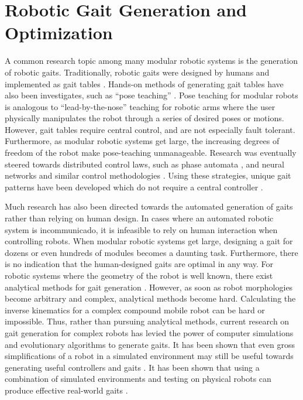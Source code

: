   \section{Robotic Gait Generation and Optimization}
    A common research topic among many modular robotic systems is the
      generation of robotic gaits. 
    Traditionally, robotic gaits were designed by humans and implemented as
      gait tables \cite{Yim2000, Kamimura2001}. 
    Hands-on methods of generating gait tables have also been investigates,
      such as ``pose teaching'' \cite{Ryland2010}. 
    Pose teaching for modular robots is analogous to ``lead-by-the-nose''
      teaching for robotic arms where the user physically manipulates the robot
      through a series of desired poses or motions.  
    However, gait tables require central control, and are not especially fault
      tolerant. 
    Furthermore, as modular robotic systems get large, the increasing degrees
      of freedom of the robot make pose-teaching unmanageable. 
    Research was eventually steered towards distributed control laws, such as
      phase automata \cite{Zhang2003}, and neural networks and similar control
      methodologies \cite{Canavier1997, Inagaki2006, Derosa2008}. 
    Using these strategies, unique gait patterns have been developed which do
      not require a central controller \cite{Sastra2009}.

    Much research has also been directed towards the automated generation of
      gaits rather than relying on human design. 
    In cases where an automated robotic system is incommunicado, it is
    infeasible to rely on human interaction when controlling robots. 
    When modular robotic systems get large, designing a gait for dozens or even
      hundreds of modules becomes a daunting task.
    Furthermore, there is no indication that the human-designed gaits are
      optimal in any way. 
    For robotic systems where the geometry of the robot is well known, there
      exist analytical methods for gait generation \cite{Weingarten2004}.
    However, as soon as robot morphologies become arbitrary and complex,
      analytical methods become hard. 
    Calculating the inverse kinematics for a complex compound mobile robot can
      be hard or impossible. 
    Thus, rather than pursuing analytical methods, current research on gait
      generation for complex robots has levied the power of computer simulations
      and evolutionary algorithms to generate gaits. 
    It has been shown that even gross simplifications of a robot in a simulated
      environment may still be useful towards generating useful controllers and
      gaits \cite{Jakobi1995, Jakobi1998, Bongard2004, Lipson2006,
      Zagal2007}. 
    It has been shown that using a combination of simulated environments and
      testing on physical robots can produce effective real-world gaits
      \cite{Zagal2007, Koos2010}. 


